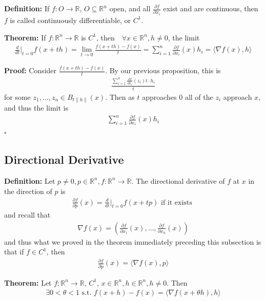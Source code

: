 \documentclass{article}
\newcommand*{\qed}{\hfill$\square$}%
\newcommand*{\txt}[1]{\text{ #1 }}%
\newcommand*{\iprod}[1]{\langle #1 \rangle}
\newcommand*{\fora}{\txt{}\forall}%
\newcommand*{\rr}{\mathbb{R}}%
\begin{document}
\textbf{Definition:} If $f:O\to \rr$, $O\subseteq \rr^n$ open, and all $\frac{\partial f}{\partial x_i}$ exist and are continuous, then $f$ is called continuously differentiable, or $C^1$.

\textbf{Theorem:} If $f:\rr^n\to\rr$ is $C^1$, then $\fora x\in \rr^n, h\neq 0$, the limit \begin{align*}
    \frac{d}{dt}|_{t=0}f(x+th)=\lim_{t\to 0} \frac{f(x+th)-f(x)}{t}=\sum_{i=1}^{n}\frac{\partial f}{\partial x_i}(x)h_i=\iprod{\nabla f(x),h}
\end{align*}

\textbf{Proof:} Consider $\frac{f(x+th)-f(x)}{t}$. By our previous proposition, this is \begin{align*}
    \frac{\sum_{i=1}^{n}\frac{\partial f}{\partial x_i}(z_i)t\cdot h_i}{t}
\end{align*} for some $z_1,\dots,z_n\in B_{t\|h\|}(x)$. Then as $t$ approaches 0 all of the $z_i$ approach $x$, and thus the limit is \begin{align*}
    \sum_{i=1}^{n}\frac{\partial f}{\partial x_i}(x)h_i
\end{align*} \qed

\subsection{Directional Derivative}

\textbf{Definition:} Let $p\neq 0, p\in \rr^n, f:\rr^n\to \rr$. The directional derivative of $f$ at $x$ in the direction of $p$ is \begin{align*}
    \frac{\partial f}{\partial p}(x)=\frac{d}{dt}|_{t=0}f(x+tp)\txt{if it exists}
\end{align*} and recall that \begin{align*}
    \nabla f(x)=(\frac{\partial f}{\partial x_1}(x),\dots,\frac{\partial f}{\partial x_n}(x))
\end{align*} and thus what we proved in the theorem immediately preceding this subsection is that if $f\in C^1$, then \begin{align*}
    \frac{\partial f}{\partial p}(x)=\iprod{\nabla f(x),p}
\end{align*}

\textbf{Theorem:} Let $f:\rr^n\to \rr$, $C^1$, $x\in \rr^n,h\in\rr^n,h\neq 0$. Then \begin{align*}
    \exists 0< \theta< 1\txt{s.t.} f(x+h)-f(x)=\iprod{\nabla f(x+\theta h),h}
\end{align*}
\end{document}
